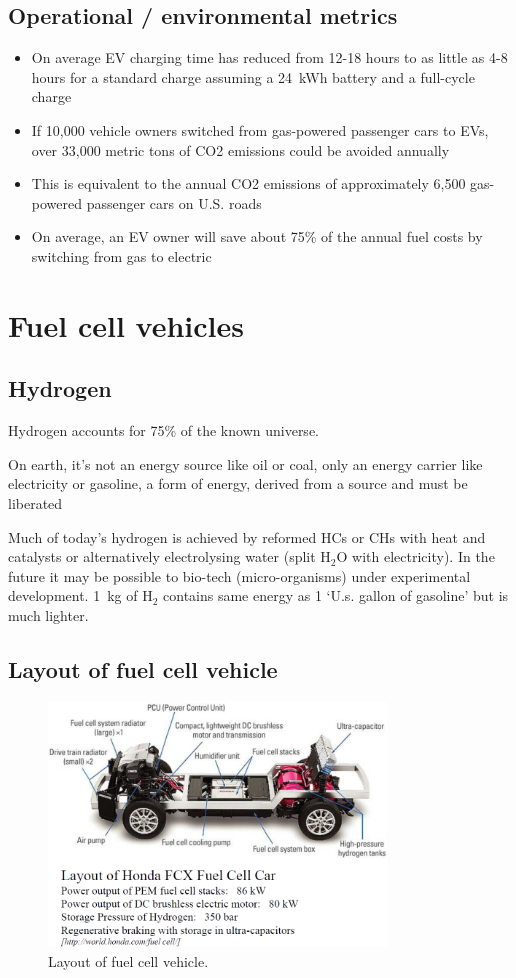 \subsection{Operational / environmental metrics}
\begin{itemize}
    \item On average EV charging time has reduced from 12-18 hours to as little as 4-8 hours for a standard charge assuming a \SI{24}{kWh} battery and a full-cycle charge
    \item If 10,000 vehicle owners switched from gas-powered passenger cars to EVs, over 33,000 metric tons of CO2 emissions could be avoided annually
    \item This is equivalent to the annual CO2 emissions of approximately 6,500 gas-powered passenger cars on U.S. roads
    \item On average, an EV owner will save about 75\% of the annual fuel costs by switching from gas to electric
\end{itemize}
\section{Fuel cell vehicles}
\subsection{Hydrogen}
Hydrogen accounts for 75\% of the known universe.
\begin{quoting}
    On earth, it's not an energy source like oil or coal, only an energy carrier like electricity or gasoline, a form of energy, derived from a source and must be liberated
\end{quoting}
Much of today's hydrogen is achieved by reformed HCs or CHs with heat and catalysts or alternatively electrolysing water (split H$_2$O with electricity). In the future it may be possible to bio-tech (micro-organisms) under experimental development. \SI{1}{\kilo\gram} of H$_2$ contains same energy as 1 `U.s. gallon of gasoline' but is much lighter.
\subsection{Layout of fuel cell vehicle}
\begin{figure}[H]
    \centering
    \includegraphics[width = 0.8\textwidth]{img/figure112.png}
    \caption{Layout of fuel cell vehicle.}
\end{figure}
